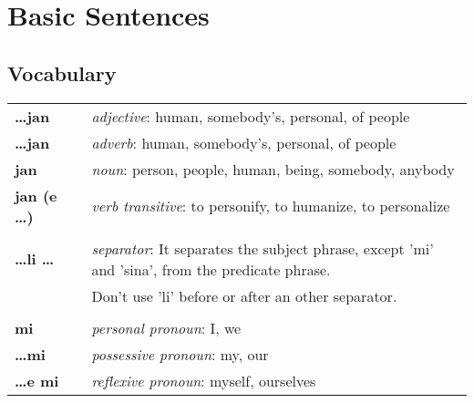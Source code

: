 
\section{Basic Sentences}
\subsection*{Vocabulary}

\begin{supertabular}{p{2,5cm}|ll}
    \textbf{\dots jan}      &  & \textit{adjective}: human, somebody's, personal, of people                                              \\
    \textbf{\dots jan}      &  & \textit{adverb}: human, somebody's, personal, of people                                                 \\
    \textbf{jan}            &  & \textit{noun}: person, people, human, being, somebody, anybody                                          \\
    \textbf{jan (e \dots)}  &  & \textit{verb transitive}: to personify, to humanize, to personalize                                     \\
                            &  &                                                                                                         \\
    \textbf{\dots li \dots} &  & \textit{separator}: It separates the subject phrase, except 'mi' and 'sina', from the predicate phrase. \\
                            &  & Don't use 'li' before or after an other separator.                                                      \\
                            &  &                                                                                                         \\
    \textbf{mi}             &  & \textit{personal pronoun}: I, we                                                                        \\
    \textbf{\dots mi}       &  & \textit{possessive pronoun}: my, our                                                                    \\
    \textbf{\dots e mi}     &  & \textit{reflexive pronoun}: myself, ourselves                                                           \\

\end{supertabular}
